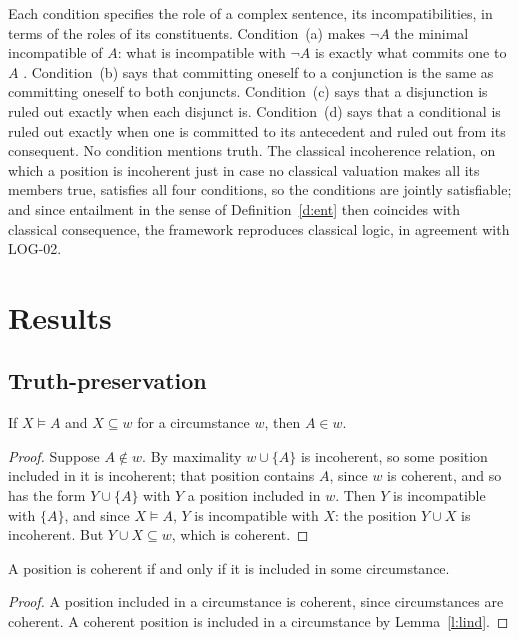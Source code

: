 \documentclass{situationist-preprint}
\begin{document}
Each condition specifies the role of a complex sentence, its incompatibilities, in terms of the roles of its constituents. Condition~(a) makes $\neg A$ the minimal incompatible of $A$: what is incompatible with $\neg A$ is exactly what commits one to $A$ \citep[ch.~5]{Brandom2008}. Condition~(b) says that committing oneself to a conjunction is the same as committing oneself to both conjuncts. Condition~(c) says that a disjunction is ruled out exactly when each disjunct is. Condition~(d) says that a conditional is ruled out exactly when one is committed to its antecedent and ruled out from its consequent. No condition mentions truth. The classical incoherence relation, on which a position is incoherent just in case no classical valuation makes all its members true, satisfies all four conditions, so the conditions are jointly satisfiable; and since entailment in the sense of Definition~\ref{d:ent} then coincides with classical consequence, the framework reproduces classical logic, in agreement with LOG-02.

\section{Results}\label{s:results}

\subsection{Truth-preservation}

\begin{lemma}[Preservation]\label{l:pres}
If $X \models A$ and $X \subseteq w$ for a circumstance $w$, then $A \in w$.
\end{lemma}

\begin{proof}
Suppose $A \notin w$. By maximality $w \cup \{A\}$ is incoherent, so some position included in it is incoherent; that position contains $A$, since $w$ is coherent, and so has the form $Y \cup \{A\}$ with $Y$ a position included in $w$. Then $Y$ is incompatible with $\{A\}$, and since $X \models A$, $Y$ is incompatible with $X$: the position $Y \cup X$ is incoherent. But $Y \cup X \subseteq w$, which is coherent.
\end{proof}

\begin{lemma}[Coherence]\label{l:coh}
A position is coherent if and only if it is included in some circumstance.
\end{lemma}

\begin{proof}
A position included in a circumstance is coherent, since circumstances are coherent. A coherent position is included in a circumstance by Lemma~\ref{l:lind}.
\end{proof}
\end{document}
